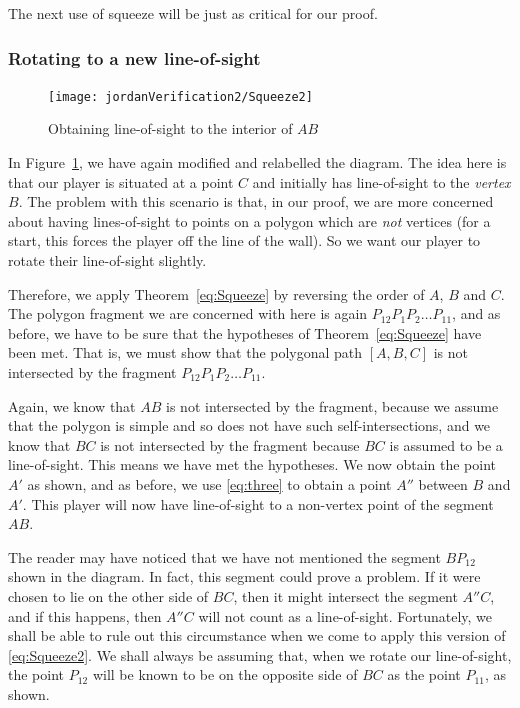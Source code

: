 The next use of squeeze will be just as critical for our proof.

\subsubsection{Rotating to a new line-of-sight}\label{sec:RotateToNew}
\begin{figure}
\centering\texttt{[image: jordanVerification2/Squeeze2]}
\caption{Obtaining line-of-sight to the interior of $AB$}
\label{fig:Squeeze2}
\end{figure}
In Figure~\ref{fig:Squeeze2}, we have again modified and relabelled the diagram. The idea here is that our player is situated at a point $C$ and initially has line-of-sight to the \emph{vertex} $B$. The problem with this scenario is that, in our proof, we are more concerned about having lines-of-sight to points on a polygon which are \emph{not} vertices (for a start, this forces the player off the line of the wall).  So we want our player to rotate their line-of-sight slightly. 

Therefore, we apply Theorem~\ref{eq:Squeeze} by reversing the order of $A$, $B$ and $C$. The polygon fragment we are concerned with here is again $P_{12}P_1P_2\ldots P_{11}$, and as before, we have to be sure that the hypotheses of Theorem~\ref{eq:Squeeze} have been met. That is, we must show that the polygonal path $[A,B,C]$ is not intersected by the fragment $P_{12}P_1P_2\ldots P_{11}$. 

Again, we know that $AB$ is not intersected by the fragment, because we assume that the polygon is simple and so does not have such self-intersections, and we know that $BC$ is not intersected by the fragment because $BC$ is assumed to be a line-of-sight. This means we have met the hypotheses. We now obtain the point $A'$ as shown, and as before, we use \ref{eq:three} to obtain a point $A''$ between $B$ and $A'$. This player will now have line-of-sight to a non-vertex point of the segment $AB$.

The reader may have noticed that we have not mentioned the segment $BP_{12}$ shown in the diagram. In fact, this segment could prove a problem. If it were chosen to lie on the other side of $BC$, then it might intersect the segment $A''C$, and if this happens, then $A''C$ will not count as a line-of-sight. Fortunately, we shall be able to rule out this circumstance when we come to apply this version of \eqref{eq:Squeeze2}. We shall always be assuming that, when we rotate our line-of-sight, the point $P_{12}$ will be known to be on the opposite side of $BC$ as the point $P_{11}$, as shown.

